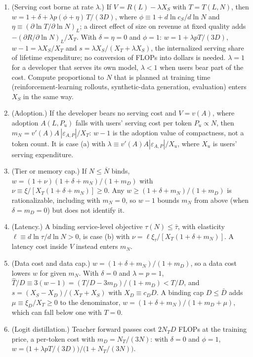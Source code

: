 \begin{proposition}
\begin{enumerate}
\begin{enumerate}
\item[(a)] (Serving cost borne at rate $\lambda$.) If $V=R(L)-\lambda X_S$ with $T=T(L,N)$, then
$w=1+\delta+\lambda p(\phi+\eta)\,T/(3D)$, where $\phi\equiv1+d\ln c_S/d\ln N$ and $\eta\equiv(\partial\ln T/\partial\ln N)_L$;
a direct effect of size on revenue at fixed quality adds $-(\partial R/\partial\ln N)_L/X_T$. With $\delta=\eta=0$ and
$\phi=1$: $w=1+\lambda pT/(3D)$, $w-1=\lambda X_S/X_T$ and $s=\lambda X_S/(X_T+\lambda X_S)$, the internalized serving share
of lifetime expenditure; no conversion of FLOPs into dollars is needed. $\lambda=1$ for a developer that serves its own
model, $\lambda<1$ when users bear part of the cost. Compute proportional to $N$ that is planned at training time
(reinforcement-learning rollouts, synthetic-data generation, evaluation) enters $X_S$ in the same way.
\item[(a$'$)] (Adoption.) If the developer bears no serving cost and $V=v(A)$, where adoption $A(L,P_u)$ falls with users'
serving cost per token $P_u\propto N$, then $m_N=v'(A)A\,|\varepsilon_{A,P}|/X_T$: $w-1$ is the adoption value of
compactness, not a token count. It is case (a) with $\lambda\equiv v'(A)A|\varepsilon_{A,P}|/X_u$, where $X_u$ is users'
serving expenditure.
\item[(b)] (Tier or memory cap.) If $N\le\bar N$ binds, $w=(1+\nu)(1+\delta+m_N)/(1+m_D)$ with
$\nu\equiv\xi/[X_T(1+\delta+m_N)]\ge0$. Any $w\ge(1+\delta+m_N)/(1+m_D)$ is rationalizable, including with $m_N=0$, so
$w-1$ bounds $m_N$ from above (when $\delta=m_D=0$) but does not identify it.
\item[(c)] (Latency.) A binding service-level objective $\tau(N)\le\bar\tau$, with elasticity
$\ell\equiv d\ln\tau/d\ln N>0$, is case (b) with $\nu=\ell\xi_\tau/[X_T(1+\delta+m_N)]$. A latency cost inside $V$
instead enters $m_N$.
\item[(d)] (Data cost and data cap.) $w=(1+\delta+m_N)/(1+m_D)$, so a data cost lowers $w$ for given $m_N$. With
$\delta=0$ and $\lambda=p=1$, $\hat T/D\equiv3(w-1)=(T/D-3m_D)/(1+m_D)<T/D$, and $s=(X_S-X_D)/(X_T+X_S)$ with
$X_D\equiv c_DD$. A binding cap $D\le\bar D$ adds $\mu\equiv\xi_D/X_T\ge0$ to the denominator,
$w=(1+\delta+m_N)/(1+m_D+\mu)$, which can fall below one with $T=0$.
\item[(e)] (Logit distillation.) Teacher forward passes cost $2N_TD$ FLOPs at the training price, a per-token cost with
$m_D=N_T/(3N)$: with $\delta=0$ and $\phi=1$, $w=\big(1+\lambda pT/(3D)\big)/\big(1+N_T/(3N)\big)$.

\end{enumerate}
\end{enumerate}
\end{proposition}

